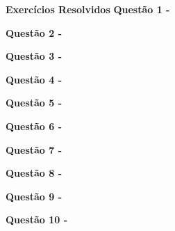 \textbf{Exercícios Resolvidos}
\vspace{0.5cm}\textbf{Questão 1 -}
        
        
        
        \vspace{0.5cm}\textbf{Questão 2 -}
        
        
        
        \vspace{0.5cm}\textbf{Questão 3 -}
        
        
        
        \vspace{0.5cm}\textbf{Questão 4 -}
        
        
        
        \vspace{0.5cm}\textbf{Questão 5 -}
        
        
        
        \vspace{0.5cm}\textbf{Questão 6 -}
        
        
        
        \vspace{0.5cm}\textbf{Questão 7 -}
        
        
        
        \vspace{0.5cm}\textbf{Questão 8 -}
        
        
        
        \vspace{0.5cm}\textbf{Questão 9 -}
        
        
        
        \vspace{0.5cm}\textbf{Questão 10 -}
        
        
        
